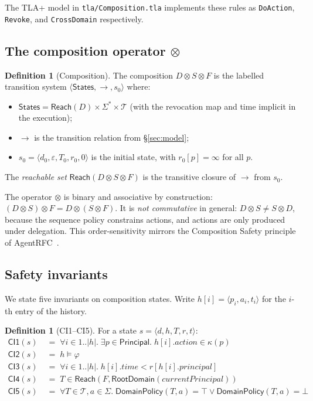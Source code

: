 \documentclass[11pt,a4paper]{article}
\theoremstyle{plain}
\theoremstyle{definition}
\newtheorem{definition}[theorem]{Definition}
\theoremstyle{remark}
\begin{document}
The TLA+ model in \texttt{tla/Composition.tla} implements these rules as
\texttt{DoAction}, \texttt{Revoke}, and \texttt{CrossDomain} respectively.

\subsection{The composition operator $\otimes$}

\begin{definition}[Composition]
The composition $D \otimes S \otimes F$ is the labelled transition system
$\langle \mathsf{States}, \to, s_0 \rangle$ where:
\begin{itemize}
  \item $\mathsf{States} = \mathsf{Reach}(D) \times \Sigma^* \times \mathcal{T}$
  (with the revocation map and time implicit in the execution);
  \item $\to$ is the transition relation from \S\ref{sec:model};
  \item $s_0 = \langle d_0, \varepsilon, T_0, r_0, 0 \rangle$ is the initial
  state, with $r_0[p] = \infty$ for all $p$.
\end{itemize}
The \emph{reachable set} $\mathsf{Reach}(D \otimes S \otimes F)$ is the
transitive closure of $\to$ from $s_0$.
\end{definition}

The operator $\otimes$ is binary and associative by construction:
$(D \otimes S) \otimes F = D \otimes (S \otimes F)$. It is \emph{not
commutative} in general: $D \otimes S \neq S \otimes D$, because the sequence
policy constrains actions, and actions are only produced under delegation.
This order-sensitivity mirrors the Composition Safety principle of
AgentRFC~\cite{agentrfc2026}.

\subsection{Safety invariants}

We state five invariants on composition states. Write $h[i] = \langle p_i,
a_i, t_i \rangle$ for the $i$-th entry of the history.

\begin{definition}[CI1--CI5]
For a state $s = \langle d, h, T, r, t \rangle$:
\begin{align*}
\mathsf{CI1}(s) &\;=\; \forall i \in 1..|h|.\; \exists p \in \mathsf{Principal}.\; h[i].\mathit{action} \in \kappa(p) \\
\mathsf{CI2}(s) &\;=\; h \models \varphi \\
\mathsf{CI3}(s) &\;=\; \forall i \in 1..|h|.\; h[i].\mathit{time} < r[h[i].\mathit{principal}] \\
\mathsf{CI4}(s) &\;=\; T \in \mathsf{Reach}(F, \mathsf{RootDomain}(\mathit{currentPrincipal})) \\
\mathsf{CI5}(s) &\;=\; \forall T \in \mathcal{T}, a \in \Sigma.\;
                  \mathsf{DomainPolicy}(T, a) = \top \vee \mathsf{DomainPolicy}(T, a) = \bot
\end{align*}
\end{definition}
\end{document}
